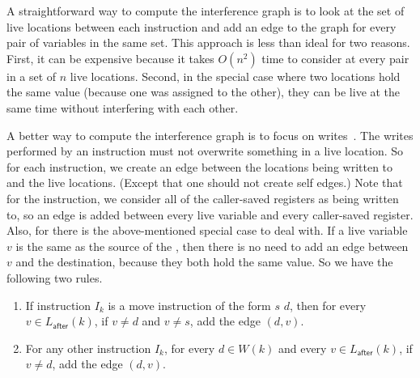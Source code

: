 \documentclass[7x10,nocrop]{TimesAPriori_MIT}%
\begin{document}
A straightforward way to compute the interference graph is to look at
the set of live locations between each instruction and add an edge to
the graph for every pair of variables in the same set.  This approach
is less than ideal for two reasons. First, it can be expensive because
it takes $O(n^2)$ time to consider at every pair in a set of $n$ live
locations. Second, in the special case where two locations hold the
same value (because one was assigned to the other), they can be live
at the same time without interfering with each other.

A better way to compute the interference graph is to focus on
writes~\citep{Appel:2003fk}. The writes performed by an instruction
must not overwrite something in a live location. So for each
instruction, we create an edge between the locations being written to
and the live locations. (Except that one should not create self
edges.)  Note that for the  instruction, we consider all of
the caller-saved registers as being written to, so an edge is added
between every live variable and every caller-saved register. Also, for
 there is the above-mentioned special case to deal with. If
a live variable $v$ is the same as the source of the , then
there is no need to add an edge between $v$ and the destination,
because they both hold the same value.
%
So we have the following two rules.

\begin{enumerate}
\item If instruction $I_k$ is a move instruction of the form
   $s$\key{,} $d$, then for every $v \in
  L_{\mathsf{after}}(k)$, if $v \neq d$ and $v \neq s$, add the edge
  $(d,v)$.

\item For any other instruction $I_k$, for every $d \in W(k)$ and
  every $v \in L_{\mathsf{after}}(k)$, if $v \neq d$, add the edge
  $(d,v)$.
\end{enumerate}
\end{document}

